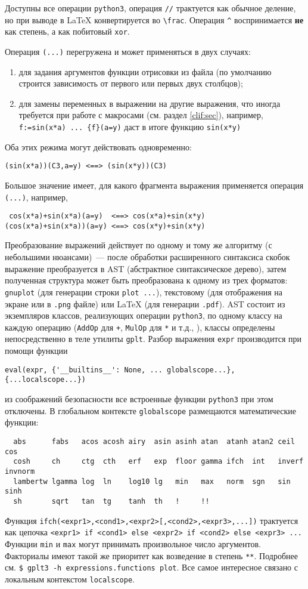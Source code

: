 \documentclass[12pt]{article}
\def\gplt{{\tt gplt}}
\def\gnuplot{{\tt gnuplot}}
\def\python{{\tt python3}}
\def\png{{\tt .png}}
\def\pdf{{\tt .pdf}}
\begin{document}
Доступны все операции \python{}, операция \verb'//' трактуется как обычное деление, но при выводе в \LaTeX{} конвертируется во \verb'\frac'.
Операция \verb'^' воспринимается {\bf не} как степень, а как побитовый \verb'xor'.

Операция \verb'(...)' перегружена и может применяться в двух случаях:
\begin{enumerate}
\item для задания аргументов функции отрисовки из файла (по умолчанию строится зависимость от первого или первых двух столбцов);
\item для замены переменных в выражении на другие выражения, что иногда требуется при работе с макросами (см. раздел \ref{clif:sec}),
  например, \verb'f:=sin(x*a) ... {f}(a=y)' даст в итоге функцию \verb'sin(x*y)'
\end{enumerate}
Оба этих режима могут действовать одновременно:
\begin{verbatim}
(sin(x*a))(C3,a=y) <==> (sin(x*y))(C3)
\end{verbatim}
Большое значение имеет, для какого фрагмента выражения применяется операция \verb'(...)', например,
\begin{verbatim}
 cos(x*a)+sin(x*a)(a=y)  <==> cos(x*a)+sin(x*y)
(cos(x*a)+sin(x*a))(a=y) <==> cos(x*y)+sin(x*y)
\end{verbatim}

Преобразование выражений действует по одному и тому же алгоритму (с небольшими нюансами)~--- после обработки расширенного синтаксиса скобок выражение преобразуется в AST
(абстрактное синтаксическое дерево), затем полученная структура может быть преобразована к одному из трех форматов: \gnuplot{} (для генерации
строки \verb'plot ...'), текстовому (для отображения на экране или в \png{} файле) или \LaTeX{} (для генерации \pdf).
AST состоит из экземпляров классов, реализующих операции \python, по одному классу на каждую операцию (\verb'AddOp' для \verb'+', \verb'MulOp' для \verb'*'
и т.д., \cite{aiv:symbalg:MM2015}),
классы определены непосредственно в теле утилиты \gplt. Разбор выражения \verb'expr' производится при помощи функции
\begin{verbatim}
eval(expr, {'__builtins__': None, ... globalscope...}, {...localscope...})
\end{verbatim}
из соображений безопасности все встроенные функции \python{} при этом отключены. В глобальном контексте \verb'globalscope' размещаются математические функции:
\begin{verbatim}
  abs      fabs   acos acosh airy  asin asinh atan  atanh atan2 ceil   cos  
  cosh     ch     ctg  cth   erf   exp  floor gamma ifch  int   inverf invnorm 
  lambertw lgamma log  ln    log10 lg   min   max   norm  sgn   sin    sinh    
  sh       sqrt   tan  tg    tanh  th   !     !!
\end{verbatim}
Функция \verb'ifch(<expr1>,<cond1>,<expr2>[,<cond2>,<expr3>,...])'  трактуется как цепочка
\verb'<expr1> if <cond1> else <expr2> if <cond2> else <expr3> ...' Функции \verb'min' и \verb'max' могут принимать произвольное число аргументов. Факториалы имеют такой же приоритет как возведение в степень \verb'**'.
Подробнее см. \verb'$ gplt3 -h expressions.functions plot'.
Все самое интересное связано с локальным контекстом \verb'localscope'.
\end{document}
